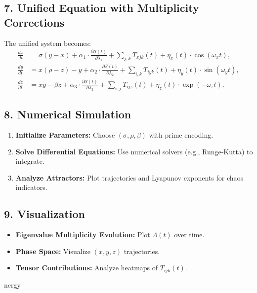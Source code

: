 \documentclass{article}
\theoremstyle{plain}
\begin{document}
\subsection*{7. Unified Equation with Multiplicity Corrections}
The unified system becomes:
\begin{align}
\frac{dx}{dt} &= \sigma(y - x) + \alpha_1 \cdot \frac{\partial \mathcal{S}(t)}{\partial \lambda_1} + \sum_{j,k} T_{xjk}(t) + \eta_x(t) \cdot \cos(\omega_x t), \\
\frac{dy}{dt} &= x(\rho - z) - y + \alpha_2 \cdot \frac{\partial \mathcal{S}(t)}{\partial \lambda_2} + \sum_{i,k} T_{iyk}(t) + \eta_y(t) \cdot \sin(\omega_y t), \\
\frac{dz}{dt} &= xy - \beta z + \alpha_3 \cdot \frac{\partial \mathcal{S}(t)}{\partial \lambda_3} + \sum_{i,j} T_{ijz}(t) + \eta_z(t) \cdot \exp(-\omega_z t).
\end{align}

\subsection*{8. Numerical Simulation}
\begin{enumerate}
    \item \textbf{Initialize Parameters:} Choose $(\sigma, \rho, \beta)$ with prime encoding.
    \item \textbf{Solve Differential Equations:} Use numerical solvers (e.g., Runge-Kutta) to integrate.
    \item \textbf{Analyze Attractors:} Plot trajectories and Lyapunov exponents for chaos indicators.
\end{enumerate}

\subsection*{9. Visualization}
\begin{itemize}
    \item \textbf{Eigenvalue Multiplicity Evolution:} Plot $\Lambda(t)$ over time.
    \item \textbf{Phase Space:} Visualize $(x, y, z)$ trajectories.
    \item \textbf{Tensor Contributions:} Analyze heatmaps of $T_{ijk}(t)$.
\end{itemize}nergy



\end{document}
